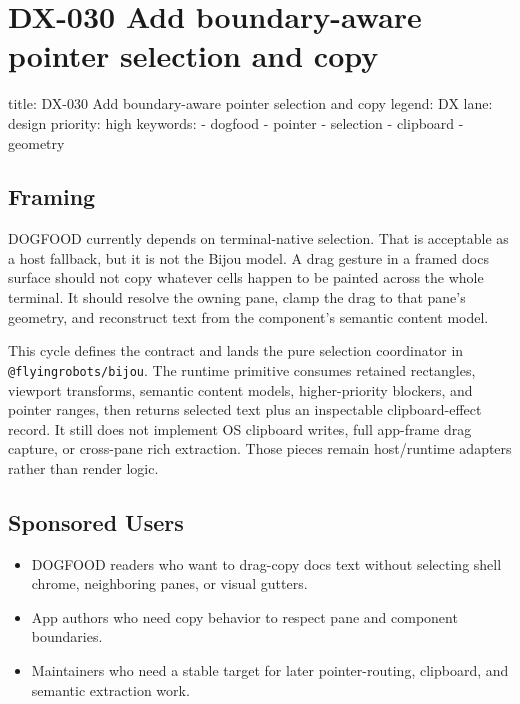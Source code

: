 \chapter{DX-030 Add boundary-aware pointer selection and copy}\label{record-127}

\smallskip

\begin{RecordMeta}
title: DX-030 Add boundary-aware pointer selection and copy
legend: DX
lane: design
priority: high
keywords:
  - dogfood
  - pointer
  - selection
  - clipboard
  - geometry

\end{RecordMeta}

\section{Framing}\label{record-127-framing}

DOGFOOD currently depends on terminal-native selection. That is acceptable as a host fallback, but it is not the Bijou model. A drag gesture in a framed docs surface should not copy whatever cells happen to be painted across the whole terminal. It should resolve the owning pane, clamp the drag to that pane's geometry, and reconstruct text from the component's semantic content model.

This cycle defines the contract and lands the pure selection coordinator in \texttt{@\allowbreak{}f\allowbreak{}l\allowbreak{}y\allowbreak{}i\allowbreak{}n\allowbreak{}g\allowbreak{}r\allowbreak{}o\allowbreak{}b\allowbreak{}o\allowbreak{}t\allowbreak{}s\allowbreak{}/\allowbreak{}b\allowbreak{}i\allowbreak{}j\allowbreak{}o\allowbreak{}u}. The runtime primitive consumes retained rectangles, viewport transforms, semantic content models, higher-priority blockers, and pointer ranges, then returns selected text plus an inspectable clipboard-effect record. It still does not implement OS clipboard writes, full app-frame drag capture, or cross-pane rich extraction. Those pieces remain host/runtime adapters rather than render logic.

\section{Sponsored Users}\label{record-127-sponsored-users}

\begin{itemize}
\tightlist
\item
  DOGFOOD readers who want to drag-copy docs text without selecting shell chrome, neighboring panes, or visual gutters.
\item
  App authors who need copy behavior to respect pane and component boundaries.
\item
  Maintainers who need a stable target for later pointer-routing, clipboard, and semantic extraction work.
\end{itemize}

